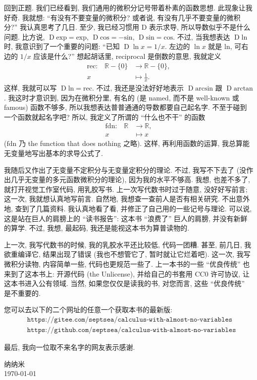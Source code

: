 回到正题. 我们已经看到, 我们通用的微积分记号带着朴素的函数思想. 此现象让我好奇. 我就想: ``有没有不要变量的微积分? 或者说, 有没有几乎不要变量的微积分?'' 我认真思考了几日. 至少, 我已经习惯用 $\mathrm{D}$ 表示求导, 所以导数似乎不是什么问题. 比方说, $\operatorname{D} \mathrm{exp} = \mathrm{exp}$, $\operatorname{D} \mathrm{cos} = -\mathrm{sin}$, $\operatorname{D} \mathrm{sin} = \mathrm{cos}$. 不过, 当我想表达 $\operatorname{D} \mathrm{ln}$ 时, 我意识到了一个重要的问题: ``已知 $\operatorname{D} \ln {x} = 1/x$. 左边的 $\ln {x}$ 就是 $\mathrm{ln}$, 可右边的 $1/x$ 应该是什么?'' 想起胡话里, reciprocal 是倒数的意思, 我就定义
\begin{align*}
    \text{$\mathrm{rec}$:} \quad
    \mathbb{R} - \{ 0 \} & \to \mathbb{R} - \{ 0 \}, \\
    x                    & \mapsto \frac{1}{x}.
\end{align*}
这样, 我就可以写 $\operatorname{D} \mathrm{ln} = \mathrm{rec}$. 不过, 我还是没法好好地表示 $\operatorname{D} \mathrm{arcsin}$ 跟 $\operatorname{D} \mathrm{arctan}$. 我这时才意识到, 因为在微积分里, 有名的 (是 named, 而不是 well-known 或 famous) 函数不够多, 所以我想表达普普通通的导数都要自己起名字. 不至于碰到一个函数就起名字吧? 所以, 我定义了所谓的 ``什么也不干'' 的函数
\begin{align*}
    \text{$\mathrm{fdn}$:} \quad
    \mathbb{R} & \to \mathbb{R}, \\
    x          & \mapsto x
\end{align*}
($\mathrm{fdn}$ 乃 the function that does nothing 之略). 这样, 再利用函数的运算, 我总算能无变量地写出基本的求导公式了.

我随后又作出了无变量不定积分与无变量定积分的理论. 不过, 我写不下去了 (没作出几乎无变量的多元函数微积分的理论), 因为我的水平不够高. 我想, 也差不多了, 就打开视觉工作室代码, 用乳胶写书. 上一次写代数书时过于随意, 没好好写前言; 这一次, 我就想认真地写前言. 自然地, 我想查一查前人是否有相关研究. 不出意外地, 查到了几篇资料. 我认真地看了看, 并修正了自己用的一些记号与理论. 可以说, 这是站在巨人的肩膀上的 ``读书报告'': 这本书 ``浪费了'' 巨人的肩膀, 并没有新鲜的算学. 不过, 我想, 最起码, 我还是能视这本书为算普读物的.

上一次, 我写代数书的时候, 我的乳胶水平还比较低, 代码一团糟. 甚至, 前几日, 我欲重编译它, 结果出现了错误 (我也不想管它了, 暂时就让它烂着吧). 这一次, 我写微积分读物, 内容简单一些, 代码也更规范一些了. 上一本书的一些 ``优良传统'' 也来到了这本书上: 开源代码 (the Unlicense), 并给自己的书套用 CC0 许可协议, 让这本书进入公有领域. 当然, 如果您仅仅是读我的书, 对您而言, 这些 ``优良传统'' 是不重要的.

您可以去以下的二个网址的任意一个获取本书的最新版:
\begin{align*}
     & \texttt{https://gitee.com/septsea/calculus-with-almost-no-variables}  \\
     & \texttt{https://github.com/septsea/calculus-with-almost-no-variables}
\end{align*}

最后, 我向一位取不来名字的网友表示感谢.

\begin{flushright}
    纳纳米\\
    \today
\end{flushright}
